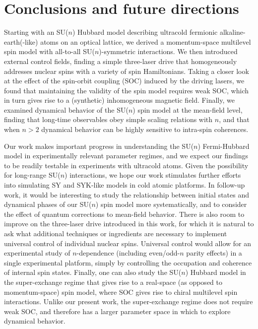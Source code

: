 \documentclass[aps,pra,nofootinbib,twocolumn,superscriptaddress]{revtex4-2}
\newcommand{\1}{\mathds{1}}
\begin{document}
\section{Conclusions and future directions}
\label{sec:conclusions}

Starting with an SU($n$) Hubbard model describing ultracold fermionic alkaline-earth(-like) atoms on an optical lattice, we derived a momentum-space multilevel spin model with all-to-all SU($n$)-symmetric interactions.
We then introduced external control fields, finding a simple three-laser drive that homogeneously addresses nuclear spins with a variety of spin Hamiltonians.
Taking a closer look at the effect of the spin-orbit coupling (SOC) induced by the driving lasers, we found that maintaining the validity of the spin model requires weak SOC, which in turn gives rise to a (synthetic) inhomogeneous magnetic field.
Finally, we examined dynamical behavior of the SU($n$) spin model at the mean-field level, finding that long-time observables obey simple scaling relations with $n$, and that when $n>2$ dynamical behavior can be highly sensitive to intra-spin coherences.

Our work makes important progress in understanding the SU($n$) Fermi-Hubbard model in experimentally relevant parameter regimes, and we expect our findings to be readily testable in experiments with ultracold atoms.
Given the possibility for long-range SU($n$) interactions, we hope our work stimulates further efforts into simulating SY and SYK-like models \cite{sachdev1993gapless, bentsen2019integrable} in cold atomic platforms.
In follow-up work, it would be interesting to study the relationship between initial states and dynamical phases of our SU($n$) spin model more systematically, and to consider the effect of quantum corrections to mean-field behavior.
There is also room to improve on the three-laser drive introduced in this work, for which it is natural to ask what additional techniques or ingredients are necessary to implement universal control of individual nuclear spins.
Universal control would allow for an experimental study of $n$-dependence (including even/odd-$n$ parity effects) in a single experimental platform, simply by controlling the occupation and coherence of internal spin states.
Finally, one can also study the SU($n$) Hubbard model in the super-exchange regime that gives rise to a real-space (as opposed to momentum-space) spin model, where SOC gives rise to chiral multilevel spin interactions.
Unlike our present work, the super-exchange regime does not require weak SOC, and therefore has a larger parameter space in which to explore dynamical behavior.
\end{document}
